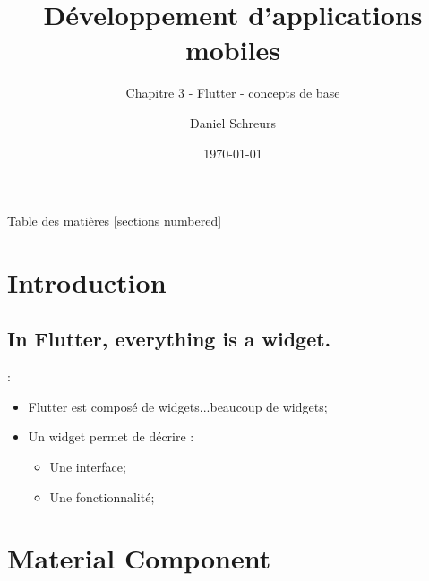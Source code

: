 \documentclass[10pt]{beamer}
\title{Développement d'applications mobiles}
\subtitle{Chapitre 3 - Flutter - concepts de base}
\date{\today}
\author{Daniel Schreurs}
\institute{Haute École de la Province de Liège}
\begin{document}
\maketitle


\begin{frame}[allowframebreaks]{Table des matières}
    [sections numbered]
    \tableofcontents
\end{frame}

\section{Introduction}
\subsection{In Flutter, everything is a widget.}
\begin{frame}[fragile,t]{\secname : \subsecname}
    \begin{itemize}
        \item Flutter est composé de widgets...beaucoup de widgets;
        \item Un widget permet de décrire :
              \begin{itemize}
                  \item Une interface;
                  \item Une fonctionnalité;
              \end{itemize}
    \end{itemize}
\end{frame}



\section{Material Component}
\end{document}
